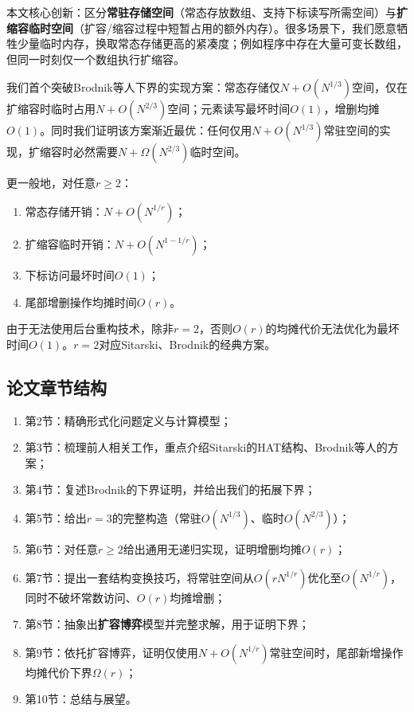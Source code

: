 \documentclass[11pt,a4paper]{article}
\begin{document}
本文核心创新：区分\textbf{常驻存储空间}（常态存放数组、支持下标读写所需空间）与\textbf{扩缩容临时空间}（扩容/缩容过程中短暂占用的额外内存）。很多场景下，我们愿意牺牲少量临时内存，换取常态存储更高的紧凑度；例如程序中存在大量可变长数组，但同一时刻仅一个数组执行扩缩容。

我们首个突破Brodnik等人下界的实现方案：常态存储仅$N+O(N^{1/3})$空间，仅在扩缩容时临时占用$N+O(N^{2/3})$空间；元素读写最坏时间$O(1)$，增删均摊$O(1)$。同时我们证明该方案渐近最优：任何仅用$N+O(N^{1/3})$常驻空间的实现，扩缩容时必然需要$N+\Omega(N^{2/3})$临时空间。

更一般地，对任意$r\ge2$：
\begin{enumerate}
    \item 常态存储开销：$N+O(N^{1/r})$；
    \item 扩缩容临时开销：$N+O(N^{1-1/r})$；
    \item 下标访问最坏时间$O(1)$；
    \item 尾部增删操作均摊时间$O(r)$。
\end{enumerate}
由于无法使用后台重构技术，除非$r=2$，否则$O(r)$的均摊代价无法优化为最坏时间$O(1)$。$r=2$对应Sitarski、Brodnik的经典方案。

\subsection{论文章节结构}
\begin{enumerate}
    \item 第2节：精确形式化问题定义与计算模型；
    \item 第3节：梳理前人相关工作，重点介绍Sitarski的HAT结构、Brodnik等人的方案；
    \item 第4节：复述Brodnik的下界证明，并给出我们的拓展下界；
    \item 第5节：给出$r=3$的完整构造（常驻$O(N^{1/3})$、临时$O(N^{2/3})$）；
    \item 第6节：对任意$r\ge2$给出通用无递归实现，证明增删均摊$O(r)$；
    \item 第7节：提出一套结构变换技巧，将常驻空间从$O(rN^{1/r})$优化至$O(N^{1/r})$，同时不破坏常数访问、$O(r)$均摊增删；
    \item 第8节：抽象出\textbf{扩容博弈}模型并完整求解，用于证明下界；
    \item 第9节：依托扩容博弈，证明仅使用$N+O(N^{1/r})$常驻空间时，尾部新增操作均摊代价下界$\Omega(r)$；
    \item 第10节：总结与展望。
\end{enumerate}
\end{document}
